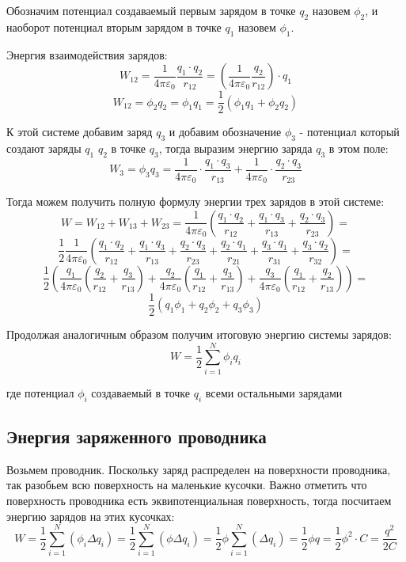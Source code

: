 \documentclass[../main.tex]{subfiles}
\begin{document}
Обозначим потенциал создаваемый первым зарядом в точке $q_2$ назовем $\phi_2$, и наоборот потенциал вторым зарядом в точке $q_1$ назовем $\phi_1$.

Энергия взаимодействия зарядов:
\[W_{12} = \frac{1}{4 \pi \varepsilon_0} \frac{q_1 \cdot q_2}{r_{12}} = (\frac{1}{4 \pi \varepsilon_0} \frac{q_2}{r_{12}}) \cdot q_1\]
\[W_{12} = \phi_2 q_2 = \phi_1 q_1 = \frac{1}{2} (\phi_1 q_1 + \phi_2 q_2)\]

К этой системе добавим заряд $q_3$ и добавим обозначение $\phi_3$ - потенциал который создают заряды $q_1$ $q_2$ в точке $q_3$,
тогда выразим энергию заряда $q_3$ в этом поле:
\[W_3 = \phi_3 q_3 = \frac{1}{4 \pi \varepsilon_0} \cdot \frac{q_1 \cdot q_3}{r_{13}} + \frac{1}{4 \pi \varepsilon_0} \cdot \frac{q_2 \cdot q_3}{r_{23}}\]

Тогда можем получить полную формулу энергии трех зарядов в этой системе:
\[W = W_{12} + W_{13} + W_{23} = \frac{1}{4 \pi \varepsilon_0} (\frac{q_1 \cdot q_2}{r_{12}} + \frac{q_1 \cdot q_3}{r_{13}}+ \frac{q_2 \cdot q_3}{r_{23}}) = \]
\[ \frac{1}{2}\frac{1}{4 \pi \varepsilon_0}(\frac{q_1 \cdot q_2}{r_{12}} + \frac{q_1 \cdot q_3}{r_{13}}+ \frac{q_2 \cdot q_3}{r_{23}} + \frac{q_2 \cdot q_1}{r_{21}} + \frac{q_3 \cdot q_1}{r_{31}}+ \frac{q_3 \cdot q_2}{r_{32}}) = \]
\[ \frac{1}{2}(\frac{q_1}{4 \pi \varepsilon_0}(\frac{q_2}{r_{12}} + \frac{q_3}{r_{13}}) + \frac{q_2}{4 \pi \varepsilon_0}(\frac{q_1}{r_{12}} + \frac{q_3}{r_{13}}) + \frac{q_3}{4 \pi \varepsilon_0}(\frac{q_1}{r_{12}} + \frac{q_2}{r_{13}}) ) = \]
\[ \frac{1}{2} (q_1 \phi_1 + q_2 \phi_2  + q_3 \phi_3) \]

Продолжая аналогичным образом получим итоговую энергию системы зарядов:
\[W = \frac{1}{2} \sum_{i=1}^{N} \phi_i q_i\]

где потенциал $\phi_i$ создаваемый в точке $q_i$ всеми остальными зарядами

\subsection{Энергия заряженного проводника}
Возьмем проводник. Поскольку заряд распределен на поверхности проводника, так разобьем всю поверхность на маленькие кусочки.
Важно отметить что поверхность проводника есть эквипотенциальная поверхность, тогда посчитаем энергию зарядов на этих кусочках:
\[W = \frac{1}{2} \sum_{i=1}^{N} (\phi_i \Delta q_i) = \frac{1}{2} \sum_{i=1}^{N} (\phi \Delta q_i) =
    \frac{1}{2} \phi \sum_{i=1}^{N} (\Delta q_i) = \frac{1}{2} \phi q = \frac{1}{2} \phi^2 \cdot C = \frac{q^2}{2C}
\]
\end{document}
